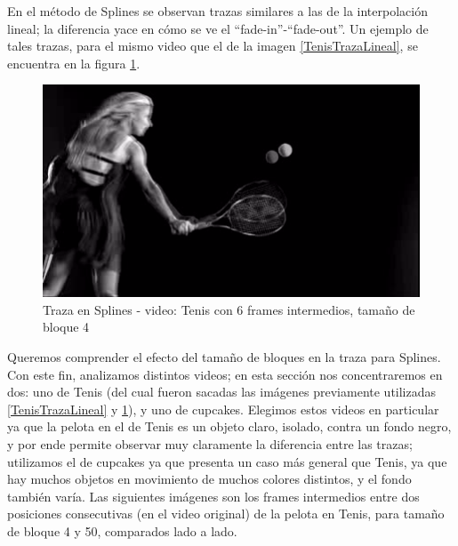 \par En el m\'etodo de Splines se observan trazas similares a las de la interpolaci\'on lineal; la diferencia yace en c\'omo se ve el ``fade-in''-``fade-out''.
Un ejemplo de tales trazas, para el mismo video que el de la imagen \ref{TenisTrazaLineal}, se encuentra en la figura \ref{TenisTrazaSplines}.

\FloatBarrier
\begin{figure}[h]
\caption{Traza en Splines - video: Tenis con 6 frames intermedios, tama\~no de bloque 4}
\label{TenisTrazaSplines}
\includegraphics[width=0.9\columnwidth]{imagenes/cualitativos/TTS.png}
\end{figure}
\FloatBarrier

\par Queremos comprender el efecto del tama\~no de bloques en la traza para Splines.
Con este fin, analizamos distintos videos; en esta secci\'on nos concentraremos en dos: uno de Tenis (del cual fueron sacadas las im\'agenes previamente utilizadas \ref{TenisTrazaLineal} y \ref{TenisTrazaSplines}), y uno de cupcakes.
Elegimos estos videos en particular ya que la pelota en el de Tenis es un objeto claro, isolado, contra un fondo negro, y por ende permite observar muy claramente la diferencia entre las trazas; 
utilizamos el de cupcakes ya que presenta un caso m\'as general que Tenis, ya que hay muchos objetos en movimiento de muchos colores distintos, y el fondo tambi\'en var\'ia.
Las siguientes im\'agenes son los frames intermedios entre dos posiciones consecutivas (en el video original) de la pelota en Tenis, para tama\~no de bloque 4 y 50, comparados lado a lado.

